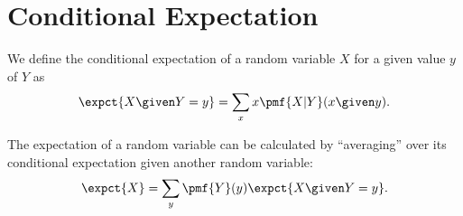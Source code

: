 \section{Conditional Expectation}
\begin{definition}
We define the conditional expectation of a random variable $X$ for a
given value $y$ of $Y$ as 
\[
\expct{X \given Y = y} = \sum_{x}{x \pmf{X | Y}(x \given y)}.
\]
\end{definition}

\begin{theorem}
\label{thm:probability::expectation::tet}
The expectation of a random variable can be calculated by
``averaging'' over its conditional expectation given another random
variable:
\[
\expct{X} = \sum_{y}{\pmf{Y}(y) \expct{X \given Y = y}}.
\]
\end{theorem}

